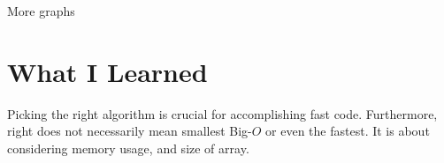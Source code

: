 \documentclass[12pt]{article}
\begin{document}
	More graphs

	\section{What I Learned}

	Picking the right algorithm is crucial for accomplishing fast code. Furthermore, right does not necessarily mean smallest Big-$O$ or even the fastest. It is about considering memory usage, and size of array.

	
\end{document}
